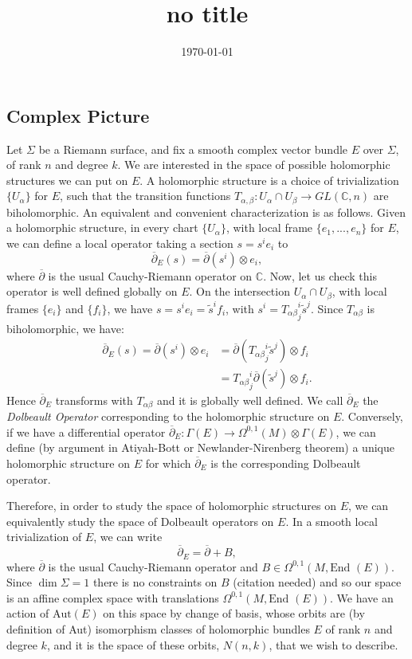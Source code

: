 \documentclass[]{article}
\title{no title}
\date{\today}
\newcommand{\End}{\text{End }}
\newcommand{\dbar}{\overline{\partial}}
\begin{document}
	\subsection{Complex Picture}
	Let $\Sigma$ be a Riemann surface, and fix a smooth complex vector bundle $E$ over $\Sigma$, of rank $n$ and degree $k$. We are interested in the space of possible holomorphic structures we can put on $E$. A holomorphic structure is a choice of trivialization $\{U_\alpha\}$ for $E$, such that the transition functions $T_{\alpha,\beta}:U_\alpha\cap U_\beta \to GL(\mathbb{C},n)$ are biholomorphic. An equivalent and convenient characterization is as follows. Given a holomorphic structure, in every chart $\{U_\alpha\}$, with local frame $\{e_1,...,e_n\}$ for $E$, we can define a local operator taking a section $s = s^i e_i$ to
	\begin{equation*}
		\dbar_E(s) = \dbar(s^i)\otimes e_i,
	\end{equation*}
	where $\dbar$ is the usual Cauchy-Riemann operator on $\mathbb{C}$. Now, let us check this operator is well defined globally on $E$. On the intersection $U_\alpha \cap U_\beta$, with local frames $\{e_i\}$ and $\{f_i\}$, we have $s = s^i e_i = \tilde{s}^i f_i$, with $s^i = {T_{\alpha\beta}}^i_j\tilde{s}^j.$ Since $T_{\alpha\beta}$ is biholomorphic, we have:
	\begin{align*}
		\dbar_E(s) = \dbar(s^i)\otimes e_i &= \dbar({T_{\alpha\beta}}^i_j \tilde{s}^j)\otimes f_i\\
		&= {T_{\alpha\beta}}^i_j \dbar(\tilde{s}^j)\otimes f_i.
	\end{align*}
	Hence $\dbar_E$ transforms with $T_{\alpha\beta}$ and it is globally well defined. We call $\dbar_E$ the \textit{Dolbeault Operator} corresponding to the holomorphic structure on $E$. Conversely, if we have a differential operator $\dbar_E:\Gamma(E) \to \Omega^{0,1}(M)\otimes \Gamma(E)$, we can define (by argument in Atiyah-Bott or Newlander-Nirenberg theorem) a unique holomorphic structure on $E$ for which $\dbar_E$ is the corresponding Dolbeault operator.
	
	Therefore, in order to study the space of holomorphic structures on $E$, we can equivalently study the space of Dolbeault operators on $E$. In a smooth local trivialization of $E$, we can write 
	\begin{equation*}
		\dbar_E = \dbar + B,
	\end{equation*}
	where $\dbar$ is the usual Cauchy-Riemann operator and $B \in \Omega^{0,1}(M, \End(E))$. Since $\dim \Sigma = 1$ there is no constraints on $B$ (citation needed) and so our space is an affine complex space with translations $\Omega^{0,1}(M,\End(E))$. We have an action of $\text{Aut}(E)$ on this space by change of basis, whose orbits are (by definition of Aut) isomorphism classes of holomorphic bundles $E$ of rank $n$ and degree $k$, and it is the space of these orbits, $N(n,k)$, that we wish to describe. 
	
\end{document}
